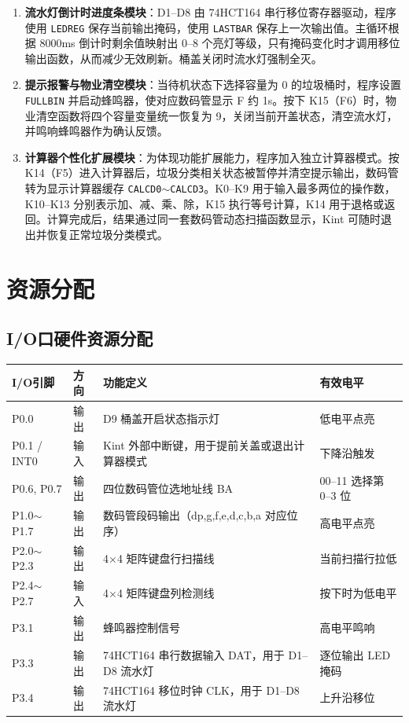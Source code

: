 \documentclass[12pt,a4paper]{article}
\begin{document}
\begin{enumerate}
    \item \textbf{流水灯倒计时进度条模块}：D1--D8 由 74HCT164 串行移位寄存器驱动，程序使用 \texttt{LEDREG} 保存当前输出掩码，使用 \texttt{LASTBAR} 保存上一次输出值。主循环根据 8000ms 倒计时剩余值映射出 0--8 个亮灯等级，只有掩码变化时才调用移位输出函数，从而减少无效刷新。桶盖关闭时流水灯强制全灭。

    \item \textbf{提示报警与物业清空模块}：当待机状态下选择容量为 0 的垃圾桶时，程序设置 \texttt{FULLBIN} 并启动蜂鸣器，使对应数码管显示 F 约 1s。按下 K15（F6）时，物业清空函数将四个容量变量统一恢复为 9，关闭当前开盖状态，清空流水灯，并鸣响蜂鸣器作为确认反馈。

    \item \textbf{计算器个性化扩展模块}：为体现功能扩展能力，程序加入独立计算器模式。按 K14（F5）进入计算器后，垃圾分类相关状态被暂停并清空提示输出，数码管转为显示计算器缓存 \texttt{CALCD0$\sim$CALCD3}。K0--K9 用于输入最多两位的操作数，K10--K13 分别表示加、减、乘、除，K15 执行等号计算，K14 用于退格或返回。计算完成后，结果通过同一套数码管动态扫描函数显示，Kint 可随时退出并恢复正常垃圾分类模式。
\end{enumerate}

\section{资源分配}
\subsection{I/O口硬件资源分配}
\begin{table}[H]
    \centering
    \small
    \begin{tabular}{|p{2.2cm}|p{1.2cm}|p{7.2cm}|p{2.6cm}|}
        \hline
        I/O引脚 & 方向 & 功能定义 & 有效电平 \\
        \hline
        P0.0 & 输出 & D9 桶盖开启状态指示灯 & 低电平点亮 \\
        \hline
        P0.1 / INT0 & 输入 & Kint 外部中断键，用于提前关盖或退出计算器模式 & 下降沿触发 \\
        \hline
        P0.6, P0.7 & 输出 & 四位数码管位选地址线 BA & 00--11 选择第 0--3 位 \\
        \hline
        P1.0$\sim$P1.7 & 输出 & 数码管段码输出（dp,g,f,e,d,c,b,a 对应位序） & 高电平点亮 \\
        \hline
        P2.0$\sim$P2.3 & 输出 & 4$\times$4 矩阵键盘行扫描线 & 当前扫描行拉低 \\
        \hline
        P2.4$\sim$P2.7 & 输入 & 4$\times$4 矩阵键盘列检测线 & 按下时为低电平 \\
        \hline
        P3.1 & 输出 & 蜂鸣器控制信号 & 高电平鸣响 \\
        \hline
        P3.3 & 输出 & 74HCT164 串行数据输入 DAT，用于 D1--D8 流水灯 & 逐位输出 LED 掩码 \\
        \hline
        P3.4 & 输出 & 74HCT164 移位时钟 CLK，用于 D1--D8 流水灯 & 上升沿移位 \\
        \hline
    \end{tabular}
\end{table}
\end{document}
